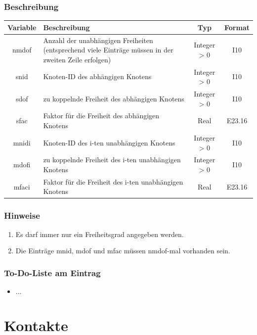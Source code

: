 \documentclass[11pt,titlepage,listof=totoc,bibliography=totoc,twoside]{scrreprt}
\begin{document}
{{\subsubsection{Beschreibung}

\begin{tabularx}{\textwidth}{cXcc}
\toprule
Variable& Beschreibung												& Typ		& Format \\
\midrule
nmdof	& Anzahl der unabhängigen Freiheiten (entsprechend viele Einträge müssen in der zweiten Zeile erfolgen)	& Integer > 0	& I10	 \\
snid	& Knoten-ID des abhängigen Knotens									& Integer > 0	& I10	 \\
sdof	& zu koppelnde Freiheit des abhängigen Knotens								& Integer > 0	& I10    \\
sfac	& Faktor für die Freiheit des abhängigen Knotens							& Real		& E23.16 \\
mnidi	& Knoten-ID des i-ten unabhängigen Knotens								& Integer > 0	& I10	 \\
mdofi	& zu koppelnde Freiheit des i-ten unabhängigen Knotens 							& Integer > 0	& I10	 \\
mfaci	& Faktor für die Freiheit des i-ten unabhängigen Knotens						& Real		& E23.16 \\
\bottomrule
\end{tabularx}

\subsubsection{Hinweise}

\begin{enumerate}
\item Es darf immer nur ein Freiheitsgrad angegeben werden.
\item Die Einträge mnid, mdof und mfac müssen nmdof-mal vorhanden sein.
\end{enumerate}

\subsubsection{To-Do-Liste am Eintrag}

\begin{itemize}
\item ...
\end{itemize}

\newpage

\section{Kontakte}

}}
\end{document}
